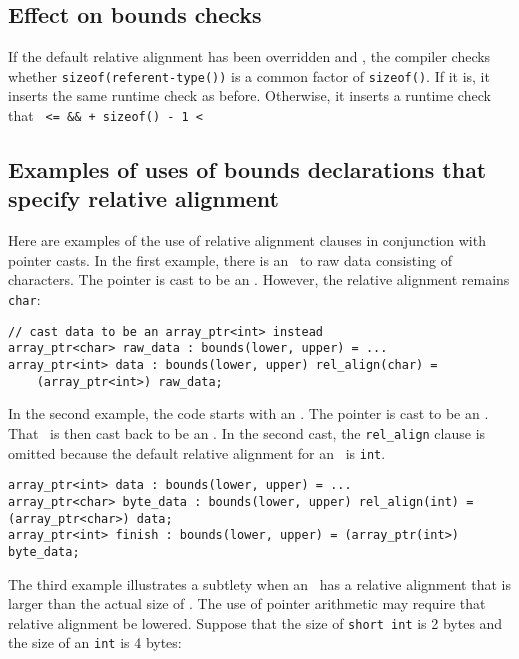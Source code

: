 \subsection{Effect on bounds checks}

If the default relative alignment has been overridden and
, the compiler checks whether
\texttt{sizeof(referent-type())} is a common factor of \texttt{sizeof()}. 
If it is, it inserts the same
runtime check as before. Otherwise, it inserts a runtime check that
\texttt{ <=  \&\&  + sizeof() - 1 < }

\subsection{Examples of uses of bounds declarations that specify relative alignment}

Here are examples of the use of relative alignment clauses in
conjunction with pointer casts. In the first example, there is an
\arrayptr\ to raw data consisting of characters. The pointer is
cast to be an \arrayptrint . However,
the relative alignment remains \texttt{char}:

\begin{verbatim}
// cast data to be an array_ptr<int> instead
array_ptr<char> raw_data : bounds(lower, upper) = ...
array_ptr<int> data : bounds(lower, upper) rel_align(char) =
    (array_ptr<int>) raw_data;
\end{verbatim}

In the second example, the code starts with an
\arrayptrint. The pointer is cast to
be an \arrayptrchar. That
\arrayptr\ is then cast back to be an
\arrayptrint . In the second cast, the
\texttt{rel\_align} clause is omitted because the default relative
alignment for an \arrayptrint\ is
\texttt{int}.

\begin{verbatim}
array_ptr<int> data : bounds(lower, upper) = ...
array_ptr<char> byte_data : bounds(lower, upper) rel_align(int) = (array_ptr<char>) data;
array_ptr<int> finish : bounds(lower, upper) = (array_ptr(int>) byte_data;
\end{verbatim}

The third example illustrates a subtlety when an
\arrayptrT\ has a
relative alignment that is larger than the actual size of . The
use of pointer arithmetic may require that relative alignment be
lowered. Suppose that the size of \texttt{short int} is 2 bytes and the
size of an \texttt{int} is 4 bytes:

